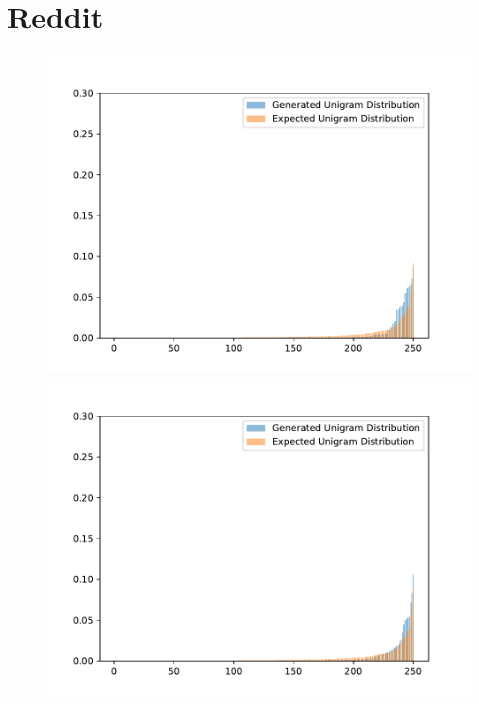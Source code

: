 \section{Reddit}
\begin{figure}[H]
  \includegraphics[width=\linewidth]{img/plots/reddit/unigram_distribution_comparison_step_500000.pdf}
  \centering
  \small
  \endminipage\hfill
  \includegraphics[width=\linewidth]{img/plots/reddit/unigram_distribution_comparison_step_1000000.pdf}
  \centering
  \small
  \endminipage\hfill

\end{figure}
